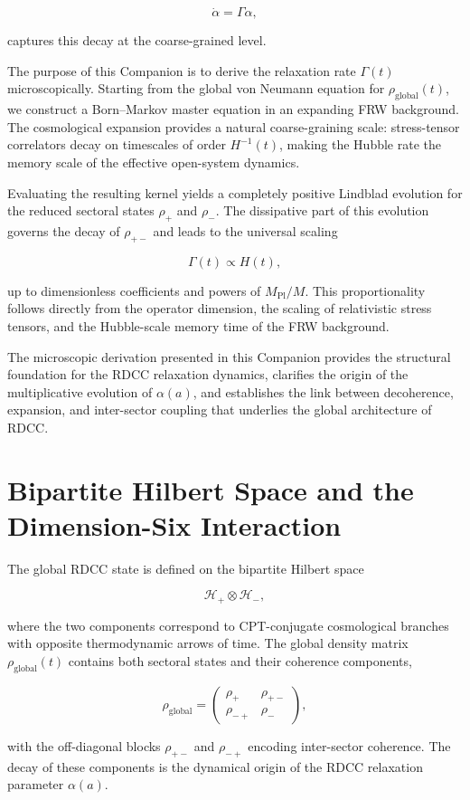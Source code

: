 \documentclass[11pt,a4paper]{article}
\newcommand{\Hglobal}{\mathcal{H}_+ \otimes \mathcal{H}_-}
\newcommand{\rglobal}{\rho_{\mathrm{global}}}
\newcommand{\rplus}{\rho_+}
\newcommand{\rminus}{\rho_-}
\newcommand{\rpm}{\rho_{+-}}
\newcommand{\rmp}{\rho_{-+}}
\newcommand{\RelaxEq}{\dot{\alpha} = \Gamma \alpha}
\begin{document}
\[
\RelaxEq,
\]


captures this decay at the coarse-grained level.

The purpose of this Companion is to derive the relaxation rate \(\Gamma(t)\)
microscopically. Starting from the global von Neumann equation for
\(\rglobal(t)\), we construct a Born--Markov master equation in an expanding FRW
background. The cosmological expansion provides a natural coarse-graining scale:
stress-tensor correlators decay on timescales of order \(H^{-1}(t)\), making the
Hubble rate the memory scale of the effective open-system dynamics.

Evaluating the resulting kernel yields a completely positive Lindblad evolution
for the reduced sectoral states \(\rplus\) and \(\rminus\). The dissipative part of
this evolution governs the decay of \(\rpm\) and leads to the universal scaling


\[
\Gamma(t) \propto H(t),
\]


up to dimensionless coefficients and powers of \(M_{\mathrm{Pl}}/M\). This
proportionality follows directly from the operator dimension, the scaling of
relativistic stress tensors, and the Hubble-scale memory time of the FRW
background.

The microscopic derivation presented in this Companion provides the structural
foundation for the RDCC relaxation dynamics, clarifies the origin of the
multiplicative evolution of \(\alpha(a)\), and establishes the link between
decoherence, expansion, and inter-sector coupling that underlies the global
architecture of RDCC.

\section{Bipartite Hilbert Space and the Dimension-Six Interaction}

The global RDCC state is defined on the bipartite Hilbert space


\[
\Hglobal,
\]


where the two components correspond to CPT-conjugate cosmological branches with
opposite thermodynamic arrows of time. The global density matrix
\(\rglobal(t)\) contains both sectoral states and their coherence components,


\[
\rglobal =
\begin{pmatrix}
\rplus & \rpm \\
\rmp   & \rminus
\end{pmatrix},
\]


with the off-diagonal blocks \(\rpm\) and \(\rmp\) encoding inter-sector
coherence. The decay of these components is the dynamical origin of the RDCC
relaxation parameter \(\alpha(a)\).
\end{document}
